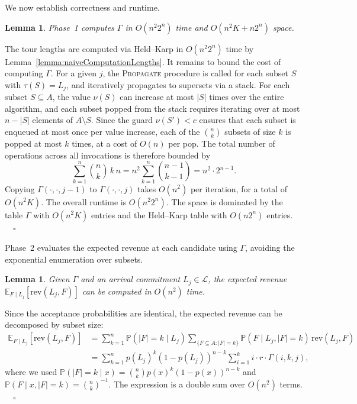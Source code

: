 \documentclass[11pt]{article}
\theoremstyle{plain}
\newtheorem{lemma}[theorem]{Lemma}
\theoremstyle{definition}
\renewenvironment{proof}[1]{\par\noindent{\itshape #1}\space\ignorespaces}{\par\medskip}
\newcommand{\Halmos}{\ensuremath{\quad\square}}
\begin{document}
	We now establish correctness and runtime.
	
	\begin{lemma}\label{lemma:computeG}
		Phase~1 computes $\Gamma$ in $O(n^2 2^n)$ time and $O(n^2 K + n 2^n)$ space.
	\end{lemma}
	\begin{proof}{Proof.}
		The tour lengths are computed via Held--Karp in $O(n^2 2^n)$ time by Lemma~\ref{lemma:naiveComputationLengths}. It remains to bound the cost of computing $\Gamma$. For a given $j$, the \textsc{Propagate} procedure is called for each subset $S$ with $\tau(S) = L_j$, and iteratively propagates to supersets via a stack. For each subset $S \subseteq A$, the value $\nu(S)$ can increase at most $|S|$ times over the entire algorithm, and each subset popped from the stack requires iterating over at most $n - |S|$ elements of $A \setminus S$. Since the guard $\nu(S') < c$ ensures that each subset is enqueued at most once per value increase, each of the $\binom{n}{k}$ subsets of size $k$ is popped at most $k$ times, at a cost of $O(n)$ per pop. The total number of operations across all invocations is therefore bounded by
		\[
		\sum_{k=1}^{n} \binom{n}{k}\, k\, n = n^2 \sum_{k=1}^{n} \binom{n-1}{k-1} = n^2 \cdot 2^{n-1}.
		\]
		Copying $\Gamma(\cdot, \cdot, j-1)$ to $\Gamma(\cdot, \cdot, j)$ takes $O(n^2)$ per iteration, for a total of $O(n^2 K)$. The overall runtime is $O(n^2 2^n)$. The space is dominated by the table $\Gamma$ with $O(n^2 K)$ entries and the Held--Karp table with $O(n 2^n)$ entries.
	\Halmos
\end{proof}
	
	Phase~2 evaluates the expected revenue at each candidate using $\Gamma$, avoiding the exponential enumeration over subsets.
	
	\begin{lemma}\label{lemma:integratedExpectedRev}
		Given $\Gamma$ and an arrival commitment $L_j \in \mathcal{L}$, the expected revenue $\mathbb{E}_{F\mid L_j}[\text{rev}(L_j, F)]$ can be computed in $O(n^2)$ time.
	\end{lemma}
	\begin{proof}{Proof.}
		Since the acceptance probabilities are identical, the expected revenue can be decomposed by subset size:
		\begin{align*}
			\mathbb{E}_{F\mid L_j}\left[ \text{rev}(L_j, F)\right]
			&= \sum_{k=1}^{n} \mathbb{P}(|F| = k \mid L_j) \sum_{\{F \subseteq A : |F| = k\}} \mathbb{P}(F \mid L_j, |F| = k)\, \text{rev}(L_j, F) \\
			&= \sum_{k=1}^{n} p(L_j)^k (1 - p(L_j))^{n-k} \sum_{i=1}^{k} i \cdot r \cdot \Gamma(i, k, j),
		\end{align*}
		where we used $\mathbb{P}(|F| = k \mid x) = \binom{n}{k} p(x)^k (1-p(x))^{n-k}$ and $\mathbb{P}(F \mid x, |F| = k) = \binom{n}{k}^{-1}$. The expression is a double sum over $O(n^2)$ terms.
	\Halmos
\end{proof}
	
\end{document}
